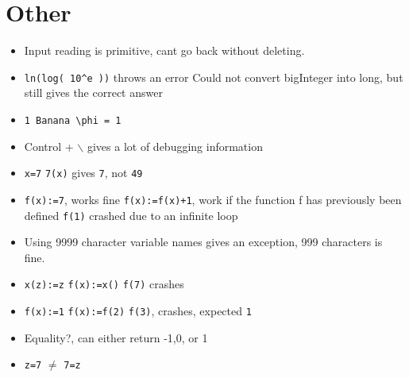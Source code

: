 \documentclass[11pt,a4paper]{article}
\begin{document}
\section{Other}
\begin{itemize}
\item Input reading is primitive, cant go back without deleting.
\item \texttt{ln(log( 10\textasciicircum{}e ))} throws an error Could not convert bigInteger into long, but still gives the correct answer
\item \texttt{1 Banana \textbackslash{}phi = 1}
\item Control + $\backslash$ gives a lot of debugging information
\item \texttt{x=7}
      \texttt{7(x)} gives \texttt{7}, not \texttt{49}
\item \texttt{f(x):=7}, works fine
\texttt{f(x):=f(x)+1}, work if the function f has previously been defined
\texttt{f(1)} crashed due to an infinite loop
\item Using 9999 character variable names gives an exception, 999 characters is fine.
\item \texttt{x(z):=z}
      \texttt{f(x):=x()}
      \texttt{f(7)}
      crashes
\item \texttt{f(x):=1}
      \texttt{f(x):=f(2)}
      \texttt{f(3)}, crashes, expected \texttt{1}
\item Equality?, can either return -1,0, or 1
\item \texttt{z=7} \(\ne\) \texttt{7=z}
\end{itemize}
\end{document}
